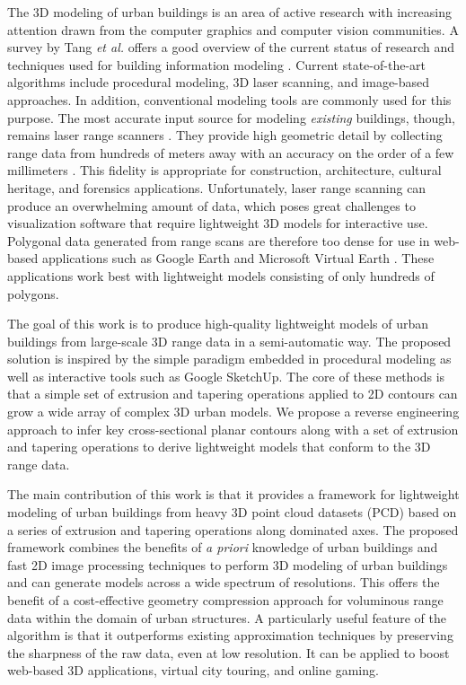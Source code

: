 \newpage
\fi %


The 3D modeling of urban buildings is an area of active research
with increasing attention drawn from the computer graphics and
computer vision communities.
A survey by Tang {\it et al.} offers a good overview of the current
status of research and techniques used for building information modeling \cite{RW_THALL}.
Current state-of-the-art algorithms include procedural modeling,
3D laser scanning, and image-based approaches.
In addition, conventional modeling tools are commonly used for this purpose.
The most accurate input source for modeling {\it existing} buildings, though,
remains laser range scanners \cite{RDP_BR}.
They provide high geometric detail by collecting range data from hundreds
of meters away with an accuracy on the order of a few millimeters \cite{RDP_LRS}.
This fidelity is appropriate for construction, architecture, cultural
heritage, and forensics applications.
Unfortunately, laser range scanning can produce an overwhelming amount of data,
which poses great challenges to visualization software that require lightweight
3D models for interactive use.
Polygonal data generated from range scans are therefore too dense for use in
web-based applications such as Google Earth \cite{RDP_GOOGE} and Microsoft Virtual Earth
\cite{RDP_MSE}.
These applications work best with lightweight models consisting of only
hundreds of polygons.

The goal of this work is to produce high-quality lightweight models of
urban buildings from large-scale 3D range data in a semi-automatic way.
The proposed solution is inspired by the simple paradigm embedded in
procedural modeling as well as interactive tools such as Google SketchUp.
The core of these methods is that a simple set of extrusion and tapering
operations applied to 2D contours can grow a wide array of complex 3D urban models.
We propose a reverse engineering approach to infer key cross-sectional
planar contours along with a set of extrusion and tapering operations to derive
lightweight models that conform to the 3D range data.

The main contribution of this work is that it provides a framework for
lightweight modeling of urban buildings from heavy 3D point cloud datasets (PCD)
based on a series of extrusion and tapering operations along dominated axes.
The proposed framework combines the benefits of
\emph{a priori} knowledge of urban buildings and fast 2D image
processing techniques to perform 3D modeling of urban buildings
and can generate models across a wide spectrum of resolutions.
This offers the benefit of a cost-effective geometry compression
approach for voluminous range data within the domain of urban structures.
A particularly useful feature of the algorithm is that it outperforms
existing approximation techniques by preserving the sharpness of the raw
data, even at low resolution.
It can be applied to boost web-based 3D applications, virtual city touring,
and online gaming.

